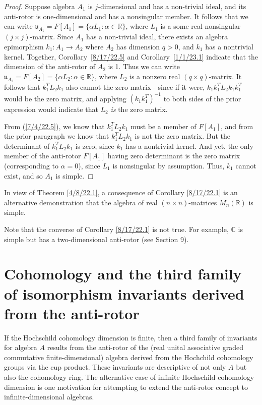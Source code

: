 \documentclass{amsart}
\numberwithin{equation}{section}
\theoremstyle{definition}
\numberwithin{theorem}{section}
\begin{document}
\begin{proof} Suppose algebra $A_1$ is $j$-dimensional and has a non-trivial ideal, and its anti-rotor is one-dimensional and has a nonsingular member.  It follows that we can write $\mathfrak{u}_{A_1} = F[A_1] = \{\alpha L_1:\alpha\in \mathbb{R}\}$, where $L_1$ is a some real nonsingular $(j\times j)$-matrix.  Since $A_1$ has a non-trivial ideal, there exists an algebra epimorphism $k_1:A_1\rightarrow A_2$ where $A_2$ has dimension $q>0$, and $k_1$ has a nontrivial kernel.  Together, \mbox{Corollary \ref{8/17/22.5}} and \mbox{Corollary \ref{1/1/23.1}} indicate that the dimension of the anti-rotor of $A_2$ is 1.   Thus we can write $\mathfrak{u}_{A_2} = F[A_2] = \{\alpha L_2:\alpha\in \mathbb{R}\}$, where $L_2$ is a nonzero real $(q\times q)$-matrix.  It follows that $k_1^T L_2 k_1$ also cannot the zero matrix - since if it were, $k_1k_1^T L_2 k_1k_1^T$ would be the zero matrix, and applying $(k_1k_1^T)^{-1}$ to both sides of the prior expression would indicate that $L_2$ {\it is} the zero matrix.  

From (\ref{7/4/22.5}), we know that $ k_1^T L_2 k_1$ must be a member of $F[A_1]$, and from the prior paragraph we know that $ k_1^T L_2 k_1$ is not the zero matrix.  But the determinant of $k_1^T L_2 k_1$ is zero, since $k_1$ has a  nontrivial kernel.  And yet, the only member of the anti-rotor $F[A_1]$ having zero determinant is the zero matrix (corresponding to $\alpha=0$), since $L_1$ is nonsingular by assumption.   Thus, $k_1$ cannot exist, and so $A_1$ is simple. \end{proof}

In view of Theorem \ref{4/8/22.1}, a consequence of Corollary \ref{8/17/22.1} is an alternative demonstration that the algebra of real $(n\times n)$-matrices $ M_n(\mathbb{R})$ is simple.  

Note that the converse of Corollary \ref{8/17/22.1} is not true.  For example, $\mathbb{C}$ is simple but has a two-dimensional anti-rotor (see Section 9). 

\section{Cohomology and the third family of isomorphism invariants derived from the anti-rotor} 
If the Hochschild cohomology dimension is finite, then a third family of invariants for algebra $A$ results from the anti-rotor of the (real unital associative graded commutative finite-dimensional) algebra derived from the Hochchild \mbox{cohomology} groups via the cup product.  These invariants are descriptive of not only $A$ but also the cohomology ring.  The alternative case of infinite Hochschild cohomology dimension is one motivation for attempting to extend the anti-rotor concept to infinite-dimensional algebras. 
\end{document}
